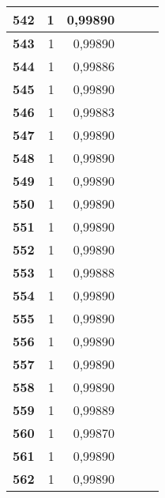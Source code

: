 {\begin{longtable}{|r|r|r|l|r|r|}
\textbf{542} & 1 & 0,99890 &  & \multicolumn{1}{l|}{} & \multicolumn{1}{l|}{} \\ \hline
\textbf{543} & 1 & 0,99890 &  & \multicolumn{1}{l|}{} & \multicolumn{1}{l|}{} \\ \hline
\textbf{544} & 1 & 0,99886 &  & \multicolumn{1}{l|}{} & \multicolumn{1}{l|}{} \\ \hline
\textbf{545} & 1 & 0,99890 &  & \multicolumn{1}{l|}{} & \multicolumn{1}{l|}{} \\ \hline
\textbf{546} & 1 & 0,99883 &  & \multicolumn{1}{l|}{} & \multicolumn{1}{l|}{} \\ \hline
\textbf{547} & 1 & 0,99890 &  & \multicolumn{1}{l|}{} & \multicolumn{1}{l|}{} \\ \hline
\textbf{548} & 1 & 0,99890 &  & \multicolumn{1}{l|}{} & \multicolumn{1}{l|}{} \\ \hline
\textbf{549} & 1 & 0,99890 &  & \multicolumn{1}{l|}{} & \multicolumn{1}{l|}{} \\ \hline
\textbf{550} & 1 & 0,99890 &  & \multicolumn{1}{l|}{} & \multicolumn{1}{l|}{} \\ \hline
\textbf{551} & 1 & 0,99890 &  & \multicolumn{1}{l|}{} & \multicolumn{1}{l|}{} \\ \hline
\textbf{552} & 1 & 0,99890 &  & \multicolumn{1}{l|}{} & \multicolumn{1}{l|}{} \\ \hline
\textbf{553} & 1 & 0,99888 &  & \multicolumn{1}{l|}{} & \multicolumn{1}{l|}{} \\ \hline
\textbf{554} & 1 & 0,99890 &  & \multicolumn{1}{l|}{} & \multicolumn{1}{l|}{} \\ \hline
\textbf{555} & 1 & 0,99890 &  & \multicolumn{1}{l|}{} & \multicolumn{1}{l|}{} \\ \hline
\textbf{556} & 1 & 0,99890 &  & \multicolumn{1}{l|}{} & \multicolumn{1}{l|}{} \\ \hline
\textbf{557} & 1 & 0,99890 &  & \multicolumn{1}{l|}{} & \multicolumn{1}{l|}{} \\ \hline
\textbf{558} & 1 & 0,99890 &  & \multicolumn{1}{l|}{} & \multicolumn{1}{l|}{} \\ \hline
\textbf{559} & 1 & 0,99889 &  & \multicolumn{1}{l|}{} & \multicolumn{1}{l|}{} \\ \hline
\textbf{560} & 1 & 0,99870 &  & \multicolumn{1}{l|}{} & \multicolumn{1}{l|}{} \\ \hline
\textbf{561} & 1 & 0,99890 &  & \multicolumn{1}{l|}{} & \multicolumn{1}{l|}{} \\ \hline
\textbf{562} & 1 & 0,99890 &  & \multicolumn{1}{l|}{} & \multicolumn{1}{l|}{} \\ \hline

\end{longtable}}
